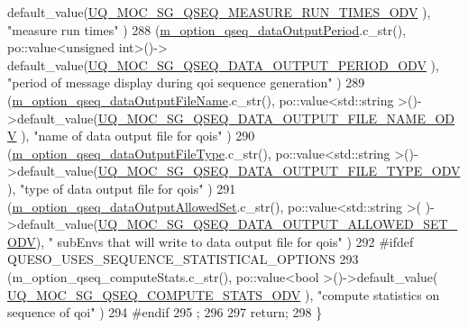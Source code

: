 \begin{DoxyCode}
      default\_value(\hyperlink{_monte_carlo_s_g_options_8h_a9e6cd4344693c5e404507ba09f968b93}{UQ\_MOC\_SG\_QSEQ\_MEASURE\_RUN\_TIMES\_ODV}      ), \textcolor{stringliteral}{"measure run
       times"}                                           )
288     (\hyperlink{class_q_u_e_s_o_1_1_monte_carlo_s_g_options_a604e3546503d8b7f9a8e0c48922b2ed7}{m\_option\_qseq\_dataOutputPeriod}.c\_str(),     po::value<unsigned int>()->
      default\_value(\hyperlink{_monte_carlo_s_g_options_8h_a402f0d84030c8ad88a785f92f438990f}{UQ\_MOC\_SG\_QSEQ\_DATA\_OUTPUT\_PERIOD\_ODV}     ), \textcolor{stringliteral}{"period of
       message display during qoi sequence generation"}    )
289     (\hyperlink{class_q_u_e_s_o_1_1_monte_carlo_s_g_options_a30620452f8188a0b4a0519bed24e64d1}{m\_option\_qseq\_dataOutputFileName}.c\_str(),   po::value<std::string >()-
      >default\_value(\hyperlink{_monte_carlo_s_g_options_8h_a1bd85693eba20c77000b09c9ecb2f15c}{UQ\_MOC\_SG\_QSEQ\_DATA\_OUTPUT\_FILE\_NAME\_ODV}  ), \textcolor{stringliteral}{"name of
       data output file for qois"}                           )
290     (\hyperlink{class_q_u_e_s_o_1_1_monte_carlo_s_g_options_a7e07046865a2e99b61ac30b94dfc8306}{m\_option\_qseq\_dataOutputFileType}.c\_str(),   po::value<std::string >()-
      >default\_value(\hyperlink{_monte_carlo_s_g_options_8h_a379ba13c2a2603fd2deee44a0b38cabf}{UQ\_MOC\_SG\_QSEQ\_DATA\_OUTPUT\_FILE\_TYPE\_ODV}  ), \textcolor{stringliteral}{"type of
       data output file for qois"}                           )
291     (\hyperlink{class_q_u_e_s_o_1_1_monte_carlo_s_g_options_a2d464d948dabe4fd9fbd1e912537b3e0}{m\_option\_qseq\_dataOutputAllowedSet}.c\_str(), po::value<std::string >(
      )->default\_value(\hyperlink{_monte_carlo_s_g_options_8h_ac3a2979aa6cf1bd4cb42e68e88b12e4a}{UQ\_MOC\_SG\_QSEQ\_DATA\_OUTPUT\_ALLOWED\_SET\_ODV}), \textcolor{stringliteral}{"
      subEnvs that will write to data output file for qois"}        )
292 #ifdef QUESO\_USES\_SEQUENCE\_STATISTICAL\_OPTIONS
293     (m\_option\_qseq\_computeStats.c\_str(),         po::value<bool        >()->default\_value(
      \hyperlink{_monte_carlo_s_g_options_8h_a4a9b193e19440e6778b2994e651df7eb}{UQ\_MOC\_SG\_QSEQ\_COMPUTE\_STATS\_ODV}          ), \textcolor{stringliteral}{"compute statistics on
       sequence of qoi"}                       )
294 #endif
295    ;
296 
297   \textcolor{keywordflow}{return};
298 \}
\end{DoxyCode}
